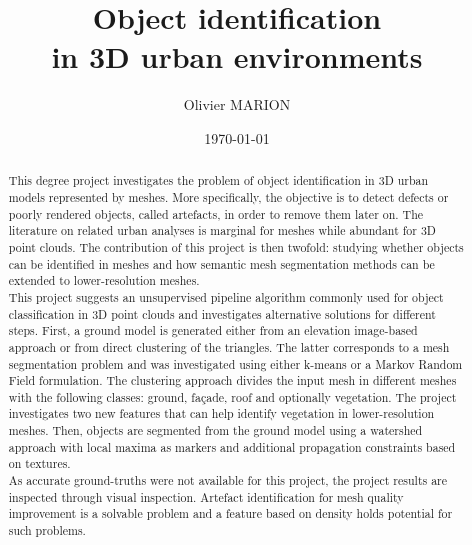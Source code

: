 \documentclass{kththesis}
\title{Object identification \\ in 3D urban environments}
\author{Olivier MARION}
\date{\today}
\begin{document}
\frontmatter

\titlepage

\begin{abstract}
This degree project investigates the problem of object identification in 3D urban models represented by meshes. More specifically, the objective is to detect defects or poorly rendered objects, called artefacts, in order to remove them later on. 
The literature on related urban analyses is marginal for meshes while abundant for 3D point clouds. The contribution of this project is then twofold: studying whether objects can be identified in meshes and how semantic mesh segmentation methods can be extended to lower-resolution meshes. \\
This project suggests an unsupervised pipeline algorithm commonly used for object classification in 3D point clouds and investigates alternative solutions for  different steps. First, a ground model is generated either from an elevation image-based approach or from direct clustering of the triangles. The latter corresponds to a mesh segmentation problem and was investigated using either k-means or a Markov Random Field formulation. The clustering approach divides the input mesh in different meshes with the following classes: ground, façade, roof and optionally vegetation. The project investigates two new features that can help identify vegetation in lower-resolution meshes. Then, objects are segmented from the ground model using a watershed approach with local maxima as markers and additional propagation constraints based on textures.  \\
As accurate ground-truths were not available for this project, the project results are inspected through visual inspection. Artefact identification for mesh quality improvement is a solvable problem and a feature based on density holds potential for such problems. 

  

\end{abstract}
\end{document}
